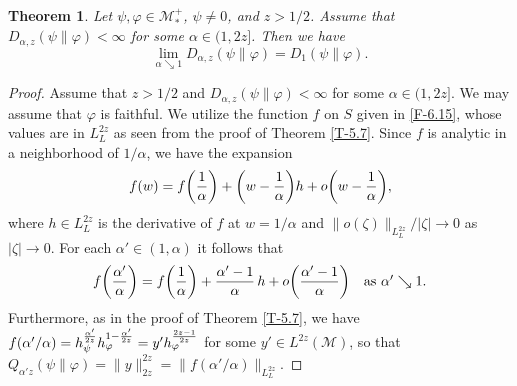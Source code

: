 \documentclass[12pt]{article}
\newtheorem{theorem}{Theorem}[section]
\theoremstyle{definition}
\theoremstyle{remark}
\numberwithin{equation}{section}
\def\Me{\mathcal M}
\def\ffi{\varphi}
\begin{document}
\begin{theorem}\label{T-6.9}
Let $\psi,\ffi\in\Me_*^+$, $\psi\ne0$, and $z>1/2$. Assume that $D_{\alpha,z}(\psi\|\ffi)<\infty$ for some
$\alpha\in(1,2z]$. Then we have
\[
\lim_{\alpha\searrow1}D_{\alpha,z}(\psi\|\ffi)=D_1(\psi\|\ffi).
\]
\end{theorem}

\begin{proof}
Assume that $z>1/2$ and $D_{\alpha,z}(\psi\|\ffi)<\infty$ for some $\alpha\in(1,2z]$. We may assume that
$\ffi$ is faithful. We utilize the function $f$ on $S$ given in \eqref{F-6.15}, whose values are in $L^{2z}_L$
as seen from the proof of Theorem \ref{T-5.7}. Since $f$ is analytic in a neighborhood of $1/\alpha$, we have
the expansion
\[
f(w)=f\biggl({1\over\alpha}\biggr)+\biggl(w-{1\over\alpha}\biggr)h+o\biggl(w-{1\over\alpha}\biggr),
\]
where $h\in L^{2z}_L$ is the derivative of $f$ at $w=1/\alpha$ and $\|o(\zeta)\|_{L^{2z}_L}/|\zeta|\to0$ as
$|\zeta|\to0$. For each $\alpha'\in(1,\alpha)$ it follows that
\[
f\biggl({\alpha'\over\alpha}\biggr)=f\biggl({1\over\alpha}\biggr)+{\alpha'-1\over\alpha}\,h
+o\biggl({\alpha'-1\over\alpha}\biggr)\quad\mbox{as $\alpha'\searrow1$}.
\]
Furthermore, as in the proof of Theorem \ref{T-5.7}, we have
$f(\alpha'/\alpha)=h_\psi^{\alpha'\over2z}h_\ffi^{1-{\alpha'\over2z}}=y'h_\ffi^{2z-1\over2z}$ for some
$y'\in L^{2z}(\Me)$, so that $Q_{\alpha'z}(\psi\|\ffi)=\|y\|_{2z}^{2z}=\|f(\alpha'/\alpha)\|_{L^{2z}_L}$.


\end{proof}
\end{document}
